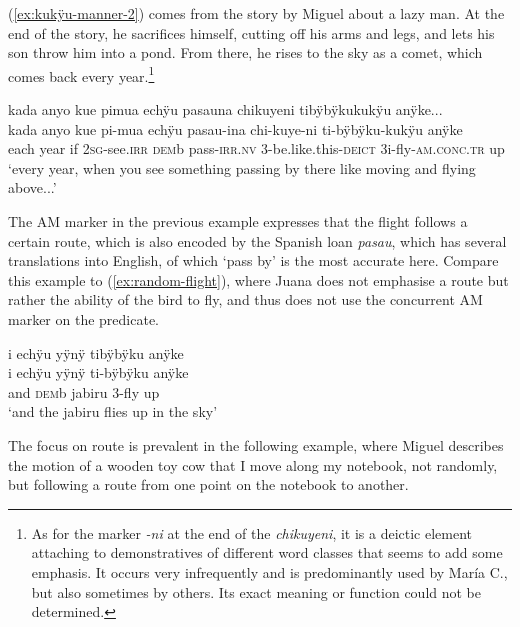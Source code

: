 (\ref{ex:kukÿu-manner-2}) comes from the story by Miguel about a lazy man. At the end of the story, he sacrifices himself, cutting off his arms and legs, and lets his son throw him into a pond. From there, he rises to the sky as a comet, which comes back every year.\footnote{As for the marker \textit{-ni} at the end of the  \textit{chikuyeni}, it is a deictic element attaching to demonstratives of different word classes that seems to add some emphasis. It occurs very infrequently and is predominantly used by María C., but also sometimes by others. Its exact meaning or function could not be determined.}

\ea\label{ex:kukÿu-manner-2}
\begingl 
\glpreamble kada anyo kue pimua echÿu pasauna chikuyeni tibÿbÿkukukÿu anÿke...\\
\gla kada anyo kue pi-mua echÿu pasau-ina chi-kuye-ni ti-bÿbÿku-kukÿu anÿke\\ 
\glb each year if 2\textsc{sg}-see.\textsc{irr} \textsc{dem}b pass-\textsc{irr.nv} 3-be.like.this-\textsc{deict} 3i-fly-\textsc{am.conc.tr} up\\ 
\glft ‘every year, when you see something passing by there like moving and flying above...’\\ 
\endgl
\trailingcitation{[mox-n110920l.128]}
\xe
{}

The AM marker in the previous example expresses that the flight follows a certain route, which is also encoded by the Spanish loan \textit{pasau}, which has several translations into English, of which ‘pass by’ is the most accurate here. Compare this example to (\ref{ex:random-flight}), where Juana does not emphasise a route but rather the ability of the bird to fly, and thus does not use the concurrent AM marker on the predicate.

\ea\label{ex:random-flight}
\begingl 
\glpreamble i echÿu yÿnÿ tibÿbÿku anÿke\\
\gla i echÿu yÿnÿ ti-bÿbÿku anÿke\\ 
\glb and \textsc{dem}b jabiru 3-fly up\\ 
\glft ‘and the jabiru flies up in the sky’\\ 
\endgl
\trailingcitation{[jxx-a120516l-a.253]}%
\xe

The focus on route is prevalent in the following example, where Miguel describes the motion of a wooden toy cow that I move along my notebook, not randomly, but following a route from one point on the notebook to another.

